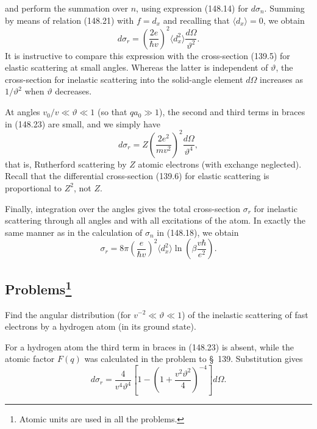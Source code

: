 and perform the summation over $n$, using expression (148.14) for
$d\sigma_n$. Summing by means of relation (148.21) with $f=d_x$ and recalling
that $\langle d_x\rangle=0$, we obtain
\begin{equation}
 d\sigma_r=\left(\frac{2e}{\hbar v}\right)^2\langle d_x^2\rangle\frac{d\Omega}{\vartheta^2}.
 \tag{148.24}
\end{equation}
It is instructive to compare this expression with the cross-section (139.5)
for elastic scattering at small angles. Whereas the latter is independent of
$\vartheta$, the cross-section for inelastic scattering into the solid-angle
element $d\Omega$ increases as $1/\vartheta^2$ when $\vartheta$ decreases.

At angles $v_0/v\ll\vartheta\ll1$ (so that $qa_0\gg1$), the second and third
terms in braces in (148.23) are small, and we simply have
\begin{equation}
 d\sigma_r=Z\left(\frac{2e^2}{mv^2}\right)^2\frac{d\Omega}{\vartheta^4},
 \tag{148.25}
\end{equation}
that is, Rutherford scattering by $Z$ atomic electrons (with exchange
neglected). Recall that the differential cross-section (139.6) for elastic
scattering is proportional to $Z^2$, not $Z$.

Finally, integration over the angles gives the total cross-section $\sigma_r$
for inelastic scattering through all angles and with all excitations of the
atom. In exactly the same manner as in the calculation of $\sigma_n$ in
(148.18), we obtain
\begin{equation}
 \sigma_r=8\pi\left(\frac{e}{\hbar v}\right)^2\langle d_x^2\rangle
 \ln\left(\beta\frac{v\hbar}{e^2}\right).
 \tag{148.26}
\end{equation}

\subsection*{Problems\footnote{Atomic units are used in all the problems.}}

 Find the angular distribution (for
$v^{-2}\ll\vartheta\ll1$) of the inelastic scattering of fast electrons by a
hydrogen atom (in its ground state).

\SolutionHeading For a hydrogen atom the third term in braces in (148.23) is
absent, while the atomic factor $F(q)$ was calculated in the problem to
\S~139. Substitution gives
\[
 d\sigma_r=\frac4{v^4\vartheta^4}\left[1-\left(1+\frac{v^2\vartheta^2}{4}\right)^{-4}\right]d\Omega.
\]


